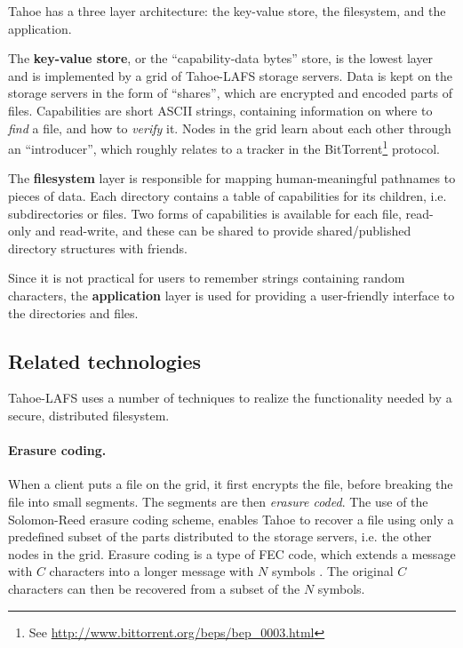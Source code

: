 \documentclass[english,12pt,a4paper]{book}
\begin{document}
Tahoe has a three layer architecture: the key-value store, the filesystem, and
the application.

The \textbf{key-value store}, or the ``capability-data bytes'' store, is the
lowest layer and is implemented by a grid of Tahoe-LAFS storage servers. Data is
kept on the storage servers in the form of ``shares'', which are encrypted and
encoded parts of files. Capabilities are short ASCII strings, containing
information on where to \emph{find} a file, and how to \emph{verify} it.
Nodes in the grid learn about each other through an ``introducer'', which
roughly relates to a tracker in the BitTorrent\footnote{See
\url{http://www.bittorrent.org/beps/bep\_0003.html}} protocol.

The \textbf{filesystem} layer is responsible for mapping human-meaningful
pathnames to pieces of data. Each directory contains a table of capabilities
for its children, i.e. subdirectories or files. Two forms of capabilities is
available for each file, read-only and read-write, and these can be shared to
provide shared/published directory structures with friends.

Since it is not practical for users to remember strings containing random
characters, the \textbf{application} layer is used for providing a user-friendly
interface to the directories and files.

\subsection{Related technologies}

Tahoe-\ac{LAFS} uses a number of techniques to realize the functionality
needed by a secure, distributed filesystem.

\paragraph{Erasure coding.}

When a client puts a file on the grid, it first encrypts the file, before
breaking the file into small segments. The segments are then \emph{erasure
coded}.  The use of the Solomon-Reed erasure coding scheme, enables Tahoe to
recover a file using only a predefined subset of the parts distributed to the
storage servers, i.e. the other nodes in the grid. Erasure coding is a type of
\ac{FEC} code, which extends a message with $C$ characters into a longer message
with $N$ symbols \cite{t_reed-solomon}.  The original $C$ characters can then be
recovered from a subset of the $N$ symbols.
\end{document}
